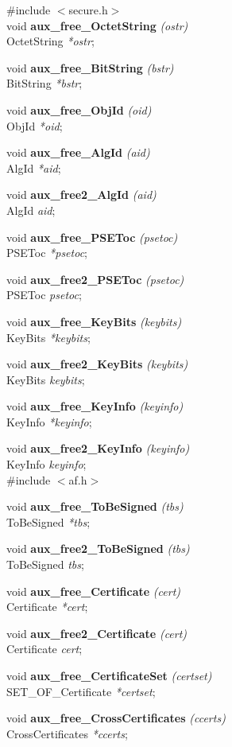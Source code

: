 \#include $<$secure.h$>$ \\
void {\bf aux\_free\_OctetString} {\em (ostr)} \\
OctetString {\em **ostr};

void {\bf aux\_free\_BitString} {\em (bstr)} \\
BitString {\em **bstr};

void {\bf aux\_free\_ObjId} {\em (oid)} \\
ObjId {\em **oid};

void {\bf aux\_free\_AlgId} {\em (aid)} \\
AlgId {\em **aid};

void {\bf aux\_free2\_AlgId} {\em (aid)} \\
AlgId {\em *aid};

void {\bf aux\_free\_PSEToc} {\em (psetoc)} \\
PSEToc {\em **psetoc};

void {\bf aux\_free2\_PSEToc} {\em (psetoc)} \\
PSEToc {\em *psetoc};

void {\bf aux\_free\_KeyBits} {\em (keybits)} \\
KeyBits {\em **keybits};

void {\bf aux\_free2\_KeyBits} {\em (keybits)} \\
KeyBits {\em *keybits};

void {\bf aux\_free\_KeyInfo} {\em (keyinfo)} \\
KeyInfo {\em **keyinfo};

void {\bf aux\_free2\_KeyInfo} {\em (keyinfo)} \\
KeyInfo {\em *keyinfo};
\\[1em]
\#include $<$af.h$>$ 

void {\bf aux\_free\_ToBeSigned} {\em (tbs)} \\
ToBeSigned {\em **tbs};

void {\bf aux\_free2\_ToBeSigned} {\em (tbs)} \\
ToBeSigned {\em *tbs};

void {\bf aux\_free\_Certificate} {\em (cert)} \\
Certificate {\em **cert};

void {\bf aux\_free2\_Certificate} {\em (cert)} \\
Certificate {\em *cert};

void {\bf aux\_free\_CertificateSet} {\em (certset)} \\
SET\_OF\_Certificate {\em **certset};

void {\bf aux\_free\_CrossCertificates} {\em (ccerts)} \\
CrossCertificates {\em **ccerts};

